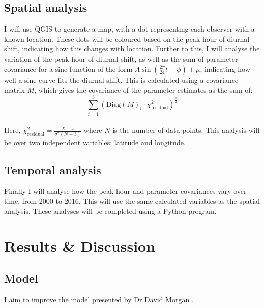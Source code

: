 \subsection{Spatial analysis}
I will use QGIS \cite{qgis} to generate a map, with a dot representing each observer with a known location. These dots will be coloured based on the peak hour of diurnal shift, indicating how this changes with location. Further to this, I will analyse the variation of the peak hour of diurnal shift, as well as the sum of parameter covariance for a sine function of the form $A \sin \left( \frac{2\pi}{24} t + \phi \right) + \mu$, indicating how well a sine curve fits the diurnal shift. This is calculated using a covariance matrix $M$, which gives the covariance of the parameter estimates as the sum of:
\begin{equation} 
\sum_{i=1}^3\left(\text{Diag}\left( M \right)_i \cdot \chi^2_{\text{residual}}\right)^{\frac{1}{2}}
\end{equation}\\
Here, $\chi^2_{\text{residual}} = \frac{X-x}{\sigma^2 (N-3)}$ where $N$ is the number of data points. 
This analysis will be over two independent variables: latitude and longitude. 
\subsection{Temporal analysis}
Finally I will analyse how the peak hour and parameter covariances vary over time, from 2000 to 2016. This will use the same calculated variables as the spatial analysis. These analyses will be completed using a Python program.

\section{Results \& Discussion}
\subsection{Model}
I aim to improve the model presented by Dr David Morgan \cite{baa}.
